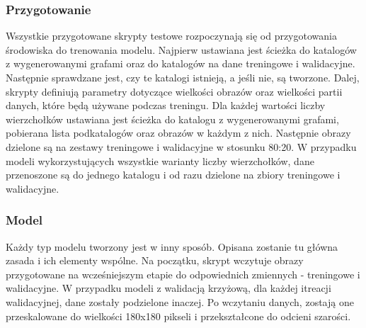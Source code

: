 \subsubsection{Przygotowanie}
Wszystkie przygotowane skrypty testowe rozpoczynają się od przygotowania środowiska do trenowania modelu.
Najpierw ustawiana jest ścieżka do katalogów z wygenerowanymi grafami oraz do katalogów na dane treningowe i walidacyjne.
Następnie sprawdzane jest, czy te katalogi istnieją, a jeśli nie, są tworzone.
Dalej, skrypty definiują parametry dotyczące wielkości obrazów oraz wielkości partii danych, które będą używane podczas treningu.
Dla każdej wartości liczby wierzchołków ustawiana jest ścieżka do katalogu z wygenerowanymi grafami,
pobierana lista podkatalogów oraz obrazów w każdym z nich.
Następnie obrazy dzielone są na zestawy treningowe i walidacyjne w stosunku 80:20.
W przypadku modeli wykorzystujących wszystkie warianty liczby wierzchołków, dane przenoszone są do jednego katalogu
i od razu dzielone na zbiory treningowe i walidacyjne.

\subsubsection{Model}
Każdy typ modelu tworzony jest w inny sposób. Opisana zostanie tu główna zasada i ich elementy wspólne.
Na początku, skrypt wczytuje obrazy przygotowane na wcześniejszym etapie do odpowiednich zmiennych - treningowe i walidacyjne.
W przypadku modeli z walidacją krzyżową, dla każdej itreacji walidacyjnej, dane zostały podzielone inaczej.
Po wczytaniu danych, zostają one przeskalowane do wielkości 180x180 pikseli i przekształcone do odcieni szarości.

